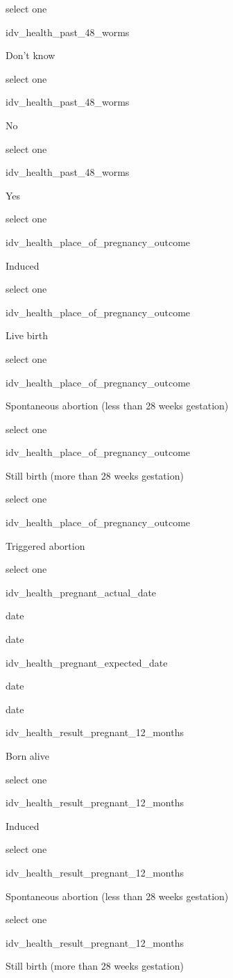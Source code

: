 \documentclass[]{article}
\begin{document}
select one

idv\_health\_past\_48\_worms

Don't know

select one

idv\_health\_past\_48\_worms

No

select one

idv\_health\_past\_48\_worms

Yes

select one

idv\_health\_place\_of\_pregnancy\_outcome

Induced

select one

idv\_health\_place\_of\_pregnancy\_outcome

Live birth

select one

idv\_health\_place\_of\_pregnancy\_outcome

Spontaneous abortion (less than 28 weeks gestation)

select one

idv\_health\_place\_of\_pregnancy\_outcome

Still birth (more than 28 weeks gestation)

select one

idv\_health\_place\_of\_pregnancy\_outcome

Triggered abortion

select one

idv\_health\_pregnant\_actual\_date

date

date

idv\_health\_pregnant\_expected\_date

date

date

idv\_health\_result\_pregnant\_12\_months

Born alive

select one

idv\_health\_result\_pregnant\_12\_months

Induced

select one

idv\_health\_result\_pregnant\_12\_months

Spontaneous abortion (less than 28 weeks gestation)

select one

idv\_health\_result\_pregnant\_12\_months

Still birth (more than 28 weeks gestation)
\end{document}
